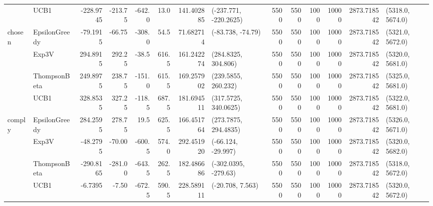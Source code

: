 \begin{tabular}{llrrrrrlrrrrrl}
   & UCB1 & -228.9745 & -213.75 & -642.0 &   13.0 &  141.402885 &  (-237.771, -220.2625) &  5500 &   5500 &  1000 &  10000 &  2873.718542 &  (5318.0, 5674.0) \\
chosen & EpsilonGreedy &  -79.1915 &  -66.75 & -308.0 &   54.5 &   71.682714 &      (-83.738, -74.79) &  5500 &   5500 &  1000 &  10000 &  2873.718542 &  (5321.0, 5672.0) \\
   & Exp3V &  294.8915 &  292.25 &  -38.5 &  616.5 &  161.242274 &    (284.8325, 304.806) &  5500 &   5500 &  1000 &  10000 &  2873.718542 &  (5320.0, 5681.0) \\
   & ThompsonBeta &  249.8975 &  238.75 & -151.0 &  615.5 &  169.257902 &    (239.5855, 260.232) &  5500 &   5500 &  1000 &  10000 &  2873.718542 &  (5325.0, 5681.0) \\
   & UCB1 &  328.8535 &  327.25 & -118.5 &  687.5 &  181.694511 &   (317.5725, 340.0625) &  5500 &   5500 &  1000 &  10000 &  2873.718542 &  (5322.0, 5681.0) \\
comply & EpsilonGreedy &  284.2595 &  278.75 &   19.5 &  625.5 &  166.451764 &   (273.7875, 294.4835) &  5500 &   5500 &  1000 &  10000 &  2873.718542 &  (5326.0, 5671.0) \\
   & Exp3V &  -48.2795 &  -70.00 & -600.5 &  574.0 &  292.451920 &     (-66.124, -29.997) &  5500 &   5500 &  1000 &  10000 &  2873.718542 &  (5320.0, 5682.0) \\
   & ThompsonBeta & -290.8165 & -281.00 & -643.5 &  262.5 &  182.486686 &   (-302.0395, -279.63) &  5500 &   5500 &  1000 &  10000 &  2873.718542 &  (5318.0, 5672.0) \\
   & UCB1 &   -6.7395 &   -7.50 & -672.5 &  590.5 &  228.589111 &       (-20.708, 7.563) &  5500 &   5500 &  1000 &  10000 &  2873.718542 &  (5320.0, 5672.0) \\
\bottomrule
\end{tabular}
